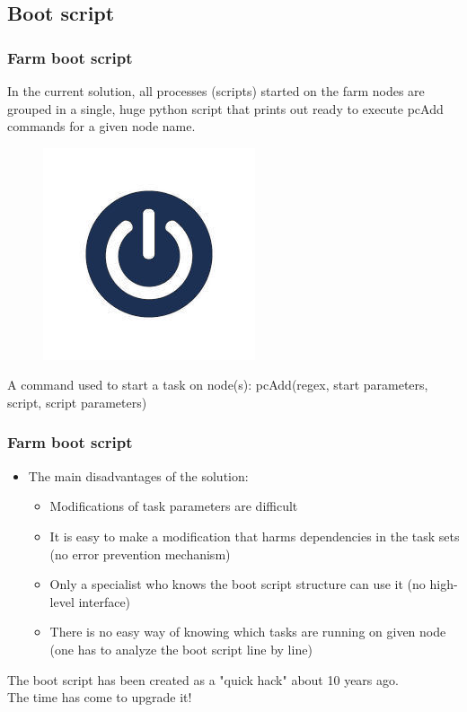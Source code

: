 \documentclass{beamer}
\begin{document}
\subsection{Boot script}
\begin{frame}
\frametitle{Farm boot script}

\noindent\begin{minipage}{0.6\textwidth}
In the current solution, all processes (scripts) started on the farm nodes are grouped in a single, huge python script that prints out ready to execute pcAdd commands for a given node name.
\end{minipage}%
\hfill%
\begin{minipage}{0.4\textwidth}\raggedleft
\begin{figure}
\includegraphics[scale=0.5]{on.jpeg}
\end{figure}
\end{minipage}
\vfill

\begin{block}{A command used to start a task on node(s):}
pcAdd(regex, start parameters, script, script parameters)
\end{block}

\end{frame}

\begin{frame}
\frametitle{Farm boot script}

\begin{itemize}
\item The main disadvantages of the solution:
\begin{itemize}
\item Modifications of task parameters are difficult
\item It is easy to make a modification that harms dependencies in the task sets (no error prevention mechanism)
\item Only a specialist who knows the boot script structure can use it (no high-level interface)
\item There is no easy way of knowing which tasks are running on given node (one has to analyze the boot script line by line)
\end{itemize}
\end{itemize}
\vfill
\begin{block}{The boot script has been created as a "quick hack" about 10 years ago. \\ The time has come to upgrade it!}
\end{block}
\end{frame}
\end{document}
